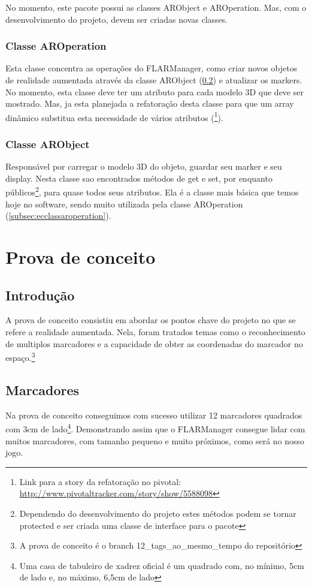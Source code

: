 \documentclass[a4paper,12pt]{book}
\begin{document}
		No momento, este pacote possui as classes ARObject e AROperation. Mas, com o
		desenvolvimento do projeto, devem ser criadas novas classes.
		
		\subsection{Classe AROperation}
		\label{subsec:ecclassearoperation}
		Esta classe concentra as opera\c c\~oes do FLARManager, como criar novos
		objetos de realidade aumentada atrav\'es da classe ARObject
		(\ref{subsec:ecclassearobject}) e atualizar os markers.
		No momento, esta classe deve ter um atributo para cada modelo 3D que deve ser
		mostrado. Mas, ja esta planejada a refatora\c c\~ao desta classe para que um
		array din\^amico substitua esta necessidade de v\'arios atributos
		(\footnote{Link para a story da refatora\c c\~ao no	pivotal: \url{http://www.pivotaltracker.com/story/show/5588098}}).
		
		
		\subsection{Classe ARObject}
		\label{subsec:ecclassearobject}
		Respons\'avel por carregar o modelo 3D do objeto, guardar seu marker e seu
		display. Nesta classe sao encontrados m\'etodos de get e set, por enquanto
		p\'ublicos\footnote{Dependendo do desenvolvimento do projeto estes m\'etodos
		podem se tornar protected e ser criada uma classe de interface para o pacote},
		para quase todos seus atributos. Ela \'e a classe mais b\'asica que temos hoje no software, sendo muito utilizada pela classe AROperation (\ref{subsec:ecclassaroperation}).
		
	\chapter{Prova de conceito}
	\label{ch:provadeconceito}
		\section{Introdu\c c\~ao}
		\label{sec:pcintroducao}
		A prova de conceito consistiu em abordar os pontos chave do projeto no que se
		refere a realidade aumentada. Nela, foram tratados temas como o reconhecimento
		de multiplos marcadores e a capacidade de obter as coordenadas do marcador no
		espa\c co.\footnote{A prova de conceito \'e o branch 12_tags_ao_mesmo_tempo
		do reposit\'orio}
		
		\section{Marcadores}
		\label{sec:pcmarcadores}
		Na prova de conceito conseguimos com sucesso utilizar 12 marcadores quadrados
		com 3cm de lado\footnote{Uma casa de tabuleiro de xadrez oficial \'e um
		quadrado com, no m\'inimo, 5cm de lado e, no m\'aximo, 6,5cm de lado}. Demonstrando assim que
		o FLARManager consegue lidar com muitos marcadores, com tamanho pequeno e muito pr\'oximos, como ser\'a no
		nosso jogo.
		
\end{document}
